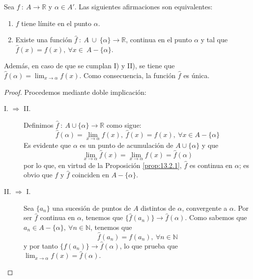 \begin{prop}
    Sea $f ~:~ A \longrightarrow \mathbb{R}$ y $\alpha \in A'$. Las siguientes afirmaciones son equivalentes:
    \begin{enumerate}
        \item $f$ tiene límite en el punto $\alpha$.
        \item Existe una función $\hat{f} ~:~ A ~\cup~ \{\alpha\} \longrightarrow \mathbb{R}$, continua en el punto $\alpha$ y tal que $\hat{f}(x) =f(x),~ \forall x \in~A-\{\alpha\}$.
    \end{enumerate}
    Además, en caso de que se cumplan I) y II), se tiene que $\hat{f}(\alpha) = \displaystyle\lim_{x \to \alpha} f(x)$.
    Como consecuencia, la función $\hat{f}$ es única.
\end{prop}
\begin{proof} Procedemos mediante doble implicación:
\begin{description}
    \item [I. $\Longrightarrow$ II.]
    Definimos $\hat{f} ~:~ A \cup \{\alpha\} \longrightarrow \mathbb{R}$ como sigue:
    \begin{equation*}
        \hat{f}(\alpha) = \displaystyle\lim_{x \to \alpha} f(x), ~ \hat{f}(x) = f(x), ~ \forall x \in A-\{\alpha\}
    \end{equation*}
    Es evidente que $\alpha$ es un punto de acumulación de $A \cup \{\alpha\}$ y que
    \begin{equation*}
        \displaystyle\lim_{x \to \alpha} \hat{f}(x) = \displaystyle\lim_{x \to \alpha} f(x) = \hat{f}(\alpha)
    \end{equation*}
    por lo que, en virtud de la Proposición \ref{prop:13.2.1}, $\hat{f}$ es continua en $\alpha$; es obvio que $f$ y $\hat{f}$
    coinciden en $A-\{\alpha\}$.

    \item [II. $\Longrightarrow$ I.]
    Sea $\{a_n\}$ una sucesión de puntos de $A$ distintos de $\alpha$, convergente a $\alpha$.
    Por ser $\hat{f}$ continua en $\alpha$, tenemos que $\{\hat{f}(a_n)\} \longrightarrow \hat{f}(\alpha)$.
    \newline
    \newline
    Como sabemos que $a_n \in A - \{\alpha\}, ~ \forall n \in \mathbb{N}$, tenemos que
    \begin{equation*}
        \hat{f}(a_n) = f(a_n), ~ \forall n \in \mathbb{N}
    \end{equation*}
    y por tanto $\{f(a_n)\} \longrightarrow \hat{f}(\alpha)$, lo que prueba que $\displaystyle\lim_{x \to \alpha} f(x) = \hat{f}(\alpha)$.
\end{description}
    
\end{proof}

